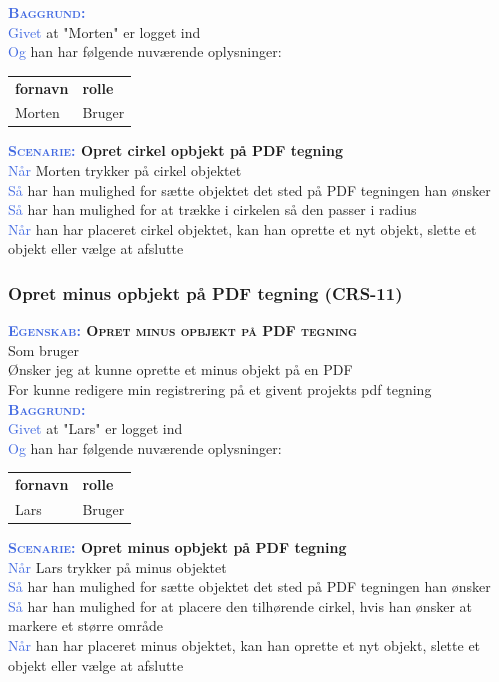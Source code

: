 \textsc{\textcolor{RoyalBlue}{\textbf{Baggrund:}}}\\
\textcolor{RoyalBlue}{Givet} at "Morten" er logget ind\\
\textcolor{RoyalBlue}{Og} han har følgende nuværende oplysninger:\\
\begin{tabular}{| l | l |}
	\textbf{fornavn} & \textbf{rolle} \\
	Morten & Bruger\\
\end{tabular}

\textbf{\textsc{\textcolor{RoyalBlue}{Scenarie:}} Opret cirkel opbjekt på PDF tegning}\\
\textcolor{RoyalBlue}{Når} Morten trykker på cirkel objektet\\
\textcolor{RoyalBlue}{Så}  har han mulighed for sætte objektet det sted på PDF tegningen han ønsker\\
\textcolor{RoyalBlue}{Så}  har han mulighed for at trække i cirkelen så den passer i radius\\
\textcolor{RoyalBlue}{Når} han har placeret cirkel objektet, kan han oprette et nyt objekt, slette et objekt eller vælge at afslutte \\

\subsubsection{Opret minus opbjekt på PDF tegning (CRS-11)} \label{sec:USOpretMinusObjekt}
\textbf{\textsc{\textcolor{RoyalBlue}{Egenskab:} Opret minus opbjekt på PDF tegning}}\\
Som bruger\\
Ønsker jeg at kunne oprette et minus objekt på en PDF\\
For kunne redigere min registrering på et givent projekts pdf tegning\\

\textsc{\textcolor{RoyalBlue}{\textbf{Baggrund:}}}\\
\textcolor{RoyalBlue}{Givet} at "Lars" er logget ind\\
\textcolor{RoyalBlue}{Og} han har følgende nuværende oplysninger:\\
\begin{tabular}{| l | l |}
	\textbf{fornavn} & \textbf{rolle} \\
	Lars & Bruger\\
\end{tabular}

\textbf{\textsc{\textcolor{RoyalBlue}{Scenarie:}} Opret minus opbjekt på PDF tegning}\\
\textcolor{RoyalBlue}{Når} Lars trykker på minus objektet\\
\textcolor{RoyalBlue}{Så}  har han mulighed for sætte objektet det sted på PDF tegningen han ønsker\\
\textcolor{RoyalBlue}{Så}  har han mulighed for at placere den tilhørende cirkel, hvis han ønsker at markere et større område\\
\textcolor{RoyalBlue}{Når} han har placeret minus objektet, kan han oprette et nyt objekt, slette et objekt eller vælge at afslutte \\

